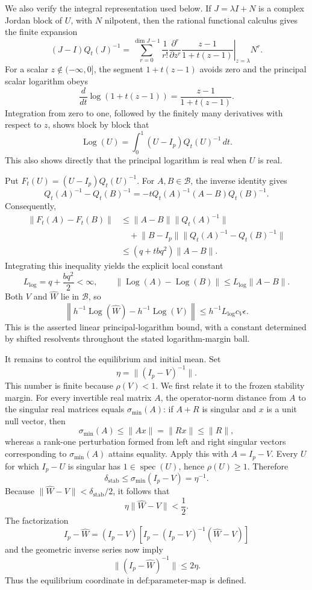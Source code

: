 We also verify the integral representation used below.  If \(J=\lambda I+N\) is a complex Jordan block of \(U\), with \(N\) nilpotent, then the rational functional calculus gives the finite expansion
\[
 (J-I)Q_t(J)^{-1}
 =\sum_{r=0}^{\dim J-1}\frac{1}{r!}
 \left.\frac{\partial^r}{\partial z^r}
 \frac{z-1}{1+t(z-1)}\right|_{z=\lambda}N^r.
\]
For a scalar \(z\notin(-\infty,0]\), the segment \(1+t(z-1)\) avoids zero and the principal scalar logarithm obeys
\[
 \frac{d}{dt}\log(1+t(z-1))
 =\frac{z-1}{1+t(z-1)}.
\]
Integration from zero to one, followed by the finitely many derivatives with respect to \(z\), shows block by block that
\[
 \operatorname{Log}(U)
 =\int_0^1(U-I_p)Q_t(U)^{-1}\,dt.
\]
This also shows directly that the principal logarithm is real when \(U\) is real.

Put \(F_t(U)=(U-I_p)Q_t(U)^{-1}\).  For \(A,B\in\mathcal B\), the inverse identity gives
\[
 Q_t(A)^{-1}-Q_t(B)^{-1}
 =-tQ_t(A)^{-1}(A-B)Q_t(B)^{-1}.
\]
Consequently,
\[
 \begin{aligned}
 \lVert F_t(A)-F_t(B)\rVert
 &\le\lVert A-B\rVert\lVert Q_t(A)^{-1}\rVert\\
 &\quad+\lVert B-I_p\rVert
       \lVert Q_t(A)^{-1}-Q_t(B)^{-1}\rVert\\
 &\le(q+tbq^2)\lVert A-B\rVert.
 \end{aligned}
\]
Integrating this inequality yields the explicit local constant
\[
 L_{\log}=q+\frac{bq^2}{2}<\infty,
 \qquad
 \lVert\operatorname{Log}(A)-\operatorname{Log}(B)\rVert
 \le L_{\log}\lVert A-B\rVert.
\]
Both \(V\) and \(\widehat W\) lie in \(\mathcal B\), so
\[
 \left\lVert h^{-1}\operatorname{Log}(\widehat W)
       -h^{-1}\operatorname{Log}(V)\right\rVert
 \le h^{-1}L_{\log}c_V\epsilon.
\]
This is the asserted linear principal-logarithm bound, with a constant determined by shifted resolvents throughout the stated logarithm-margin ball.

It remains to control the equilibrium and initial mean.  Set
\[
 \eta=\lVert(I_p-V)^{-1}\rVert.
\]
This number is finite because \(\rho(V)<1\).  We first relate it to the frozen stability margin.  For every invertible real matrix \(A\), the operator-norm distance from \(A\) to the singular real matrices equals \(\sigma_{\min}(A)\): if \(A+R\) is singular and \(x\) is a unit null vector, then
\[
 \sigma_{\min}(A)\le\lVert Ax\rVert=\lVert Rx\rVert\le\lVert R\rVert,
\]
whereas a rank-one perturbation formed from left and right singular vectors corresponding to \(\sigma_{\min}(A)\) attains equality.  Apply this with \(A=I_p-V\).  Every \(U\) for which \(I_p-U\) is singular has \(1\in\operatorname{spec}(U)\), hence \(\rho(U)\ge1\).  Therefore
\[
 \delta_{\mathrm{stab}}
 \le\sigma_{\min}(I_p-V)
 =\eta^{-1}.
\]
Because \(\lVert\widehat W-V\rVert<\delta_{\mathrm{stab}}/2\), it follows that
\[
 \eta\lVert\widehat W-V\rVert<\frac12.
\]
The factorization
\[
 I_p-\widehat W
 =(I_p-V)\left[I_p-(I_p-V)^{-1}(\widehat W-V)\right]
\]
and the geometric inverse series now imply
\[
 \lVert(I_p-\widehat W)^{-1}\rVert\le2\eta.
\]
Thus the equilibrium coordinate in \(\text{def:parameter-map}\) is defined.

